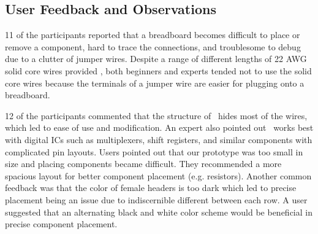 


\subsection{User Feedback and Observations}


11 of the participants reported that a breadboard becomes difficult to place or remove a component, hard to trace the connections, and troublesome to debug due to a clutter of jumper wires. Despite a range of different lengths of 22 AWG solid core wires provided 
, both beginners and experts tended not to use the solid core wires because the terminals of a jumper wire are easier for plugging onto a breadboard. 

12 of the participants commented that the structure of \papertitle\ hides most of the wires, which led to ease of use and modification. An expert also pointed out \papertitle\ works best with digital ICs such as multiplexers, shift registers, and similar components with complicated pin layouts.
Users pointed out that our prototype was too small in size and placing components became difficult. They recommended a more spacious layout for better component placement (e.g. resistors).
Another common feedback was that the color of female headers is too dark which led to precise placement being an issue due to indiscernible different between each row. A user suggested that an alternating black and white color scheme would be beneficial in precise component placement.


